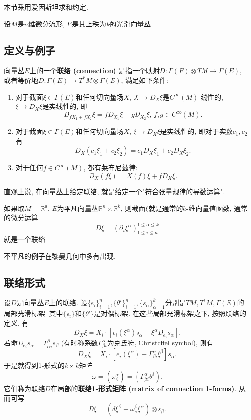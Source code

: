 
本节采用爱因斯坦求和约定.

设$M$是$n$维微分流形, $E$是其上秩为$k$的光滑向量丛. 

\subsection{定义与例子}
向量丛$E$上的一个\textbf{联络 (connection) }是指一个映射$D:\Gamma(E)\otimes TM\to\Gamma(E)$, 或者等价地$D:\Gamma(E)\to T^*M\otimes\Gamma(E)$, 满足如下条件:

\begin{enumerate}
\item 对于截面$\xi\in\Gamma(E)$和任何切向量场$X$, $X\to D_X\xi$是$C^\infty(M)$-线性的, $\xi\to D_X\xi$是实线性的, 即
$$
D_{fX_1+fX_2}\xi=fD_{X_1}\xi+gD_{X_2}\xi,\,f,g\in C^\infty(M).
$$
\item 对于截面$\xi\in\Gamma(E)$和任何切向量场$X$, $\xi\to D_X\xi$是实线性的, 即对于实数$c_1,c_2$有
$$
D_X(c_1\xi_1+c_2\xi_2)=c_1D_X\xi_1+c_2D_X\xi_2.
$$
\item 对于任何$f\in C^\infty(M)$, 都有莱布尼兹律:
$$
D_X(f\xi)=X(f)\xi+fD_X\xi.
$$
\end{enumerate}

直观上说, 在向量丛上给定联络, 就是给定一个"符合张量规律的导数运算". 

如果取$M=\mathbb{R}^n$, $E$为平凡向量丛$\mathbb{R}^n\times\mathbb{R}^k$, 则截面$\xi$就是通常的$k$-维向量值函数, 通常的微分运算
$$
D\xi=(\partial_i\xi^\alpha)_{1\leq i\leq n}^{1\leq\alpha\leq k}
$$
就是一个联络.

不平凡的例子在黎曼几何中多有出现.

\subsection{联络形式}
设$D$是向量丛$E$上的联络. 设$\{e_i\}_{i=1}^n,\{\theta^i\}_{i=1}^n,\{s_\alpha\}_{\alpha=1}^k$分别是$TM,T^*M,\Gamma(E)$的局部光滑标架, 其中$\{e_i\}$和$\{\theta^i\}$是对偶标架. 在这些局部光滑标架之下, 按照联络的定义, 有
$$
D_X\xi=X_i\cdot\left[e_i(\xi^\alpha)s_\alpha+\xi^\alpha D_{e_i}s_\alpha\right].
$$
若命$D_{e_i}s_\alpha=\Gamma_{\alpha i}^\beta s_\beta$ (有时称系数$\Gamma^\alpha_{\beta i}$为克氏符, Christoffel symbol), 则有
$$
D_X\xi=X_i\cdot\left[e_i(\xi^\alpha)+\Gamma_{\beta i}^\alpha\xi^\beta \right]s_\alpha.
$$
于是就得到1-形式的$k\times k$矩阵
$$
\omega=(\omega_\beta^\alpha)=(\Gamma_{\beta i}^\alpha\theta^i).
$$
它们称为联络$D$在局部的\textbf{联络1-形式矩阵 (matrix of connection 1-forms)}. 从而可写
$$
D\xi=(d\xi^\beta+\omega_\alpha^\beta\xi^\alpha)\otimes s_\beta.
$$

